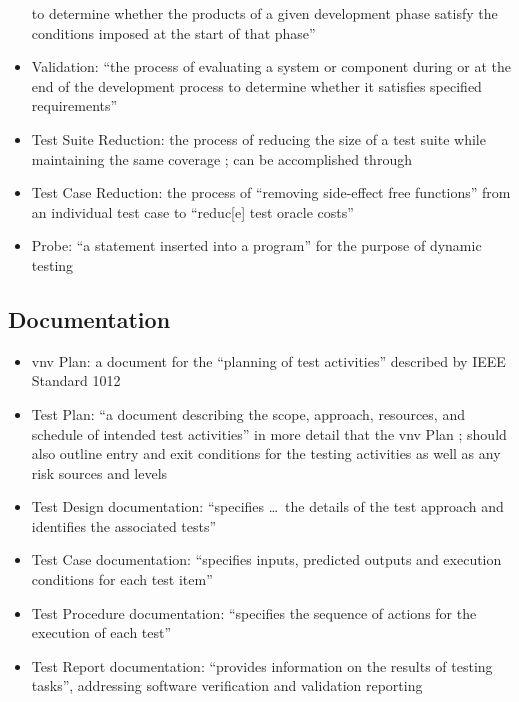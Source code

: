 \begin{itemize}
            to determine whether the products of a given development phase
            satisfy the conditions imposed at the start of that phase''
            \citep[p.~400]{vanVliet2000}
      \item Validation: ``the process of evaluating a system or component
            during or at the end of the development process to determine
            whether it satisfies specified requirements''
            \citep[p.~400]{vanVliet2000}
      \item Test Suite Reduction: the process of reducing the size of a test
            suite while maintaining the same coverage
            \citep[p.~519]{BarrEtAl2015}; can be accomplished through
      \item Test Case Reduction: the process of ``removing side-effect free
            functions'' from an individual test case to ``reduc[e] test oracle
            costs'' \citep[p.~519]{BarrEtAl2015}
      \item Probe: ``a statement inserted into a program'' for the purpose of
            dynamic testing \citep[p.~438]{PetersAndPedrycz2000}
\end{itemize}

\subsection{Documentation}

\begin{itemize}
      \item \acf{vnv} Plan: a document for the ``planning of test activities''
            described by IEEE Standard 1012 \citep[p.~411]{vanVliet2000}
      \item Test Plan: ``a document describing the scope, approach, resources,
            and schedule of intended test activities'' in more detail that the
            \acs{vnv} Plan \citep[pp.~412-413]{vanVliet2000};
            should also outline entry and exit conditions for the testing
            activities as well as any risk sources and levels
            \citep[p.~445]{PetersAndPedrycz2000}
      \item Test Design documentation: ``specifies \dots\ the details of the
            test approach and identifies the associated tests''
            \citep[p.~413]{vanVliet2000}
      \item Test Case documentation: ``specifies inputs, predicted outputs and
            execution conditions for each test item''
            \citep[p.~413]{vanVliet2000}
      \item Test Procedure documentation: ``specifies the sequence of actions
            for the execution of each test'' \citep[p.~413]{vanVliet2000}
      \item Test Report documentation: ``provides information on the results of
            testing tasks'', addressing software verification and validation
            reporting \citep[p.~413]{vanVliet2000}
\end{itemize}

